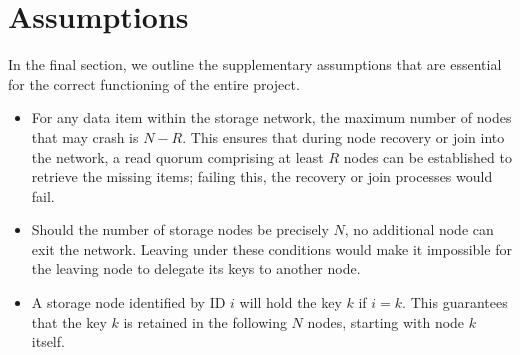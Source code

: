 \documentclass[a4paper, 11pt]{article}
\begin{document}
\section{Assumptions}\label{assumptions}
In the final section, we outline the supplementary assumptions that are essential for the correct functioning of the entire project.
\begin{itemize}
    \item For any data item within the storage network, the maximum number of nodes that may crash is $N-R$. This ensures that during node recovery or join into the network, a read quorum comprising at least $R$ nodes can be established to retrieve the missing items; failing this, the recovery or join processes would fail.
    \item Should the number of storage nodes be precisely $N$, no additional node can exit the network. Leaving under these conditions would make it impossible for the leaving node to delegate its keys to another node.
    \item A storage node identified by ID $i$ will hold the key $k$ if $i = k$. This guarantees that the key $k$ is retained in the following $N$ nodes, starting with node $k$ itself.
\end{itemize}
\end{document}

